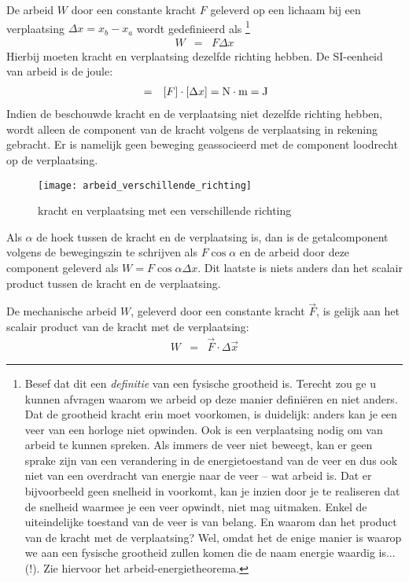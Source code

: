 \documentclass{ximera}
\begin{document}
	De arbeid $W$ door een constante kracht $F$ geleverd op een lichaam bij een verplaatsing $\Delta x=x_b-x_a$ wordt gedefinieerd als \footnote{Besef dat dit een \textit{definitie} van een fysische grootheid is. Terecht zou ge u kunnen afvragen waarom we arbeid op deze manier defini\"eren en niet anders. Dat de grootheid kracht erin moet voorkomen, is duidelijk: anders kan je een veer van een horloge niet opwinden. Ook is een verplaatsing nodig om van arbeid te kunnen spreken. Als immers de veer niet beweegt, kan er geen sprake zijn van een verandering in de energietoestand van de veer en dus ook niet van een overdracht van energie naar de veer -- wat arbeid is. Dat er bijvoorbeeld geen snelheid in voorkomt, kan je inzien door je te realiseren dat de snelheid waarmee je een veer opwindt, niet mag uitmaken. Enkel de uiteindelijke toestand van de veer is van belang. En waarom dan het product van de kracht met de verplaatsing? Wel, omdat het de enige manier is waarop we aan een fysische grootheid zullen komen die de naam energie waardig is... (!). Zie hiervoor het arbeid-energietheorema.}
	\begin{eqnarray}
	W&=&F\Delta x
	\end{eqnarray}
	Hierbij moeten kracht en verplaatsing dezelfde richting hebben. De SI-eenheid van arbeid is de joule:
	\begin{eqnarray*}
	[W]&=&[F]\cdot[\Delta x]=\rm N\cdot m=J
	\end{eqnarray*}
	Indien de beschouwde kracht en de verplaatsing niet dezelfde richting hebben, wordt alleen de component van de kracht volgens de verplaatsing in rekening gebracht. Er is namelijk geen beweging geassocieerd met de component loodrecht op de verplaatsing.
	\begin{figure}[h]
	\begin{center}
	\texttt{[image: arbeid\_verschillende\_richting]}
	\caption{kracht en verplaatsing met een verschillende richting}
	\end{center}
	\end{figure}
	
	Als $\alpha$ de hoek tussen de kracht en de verplaatsing is, dan is de getalcomponent volgens de bewegingszin te schrijven als $F\cos{\alpha}$ en de arbeid door deze component geleverd als $W=F\cos{\alpha}\Delta x$. Dit laatste is niets anders dan het scalair product tussen de kracht en de verplaatsing.
	
	De mechanische arbeid $W$, geleverd door een constante kracht $\vec{F}$, is gelijk aan het scalair product van de kracht met de verplaatsing:
	\begin{eqnarray}
	W&=&\vec{F}\cdot\Delta\vec{x}\label{def_arbeid_cste_kracht}
	\end{eqnarray}
	
	
	
	
	
\end{document}
